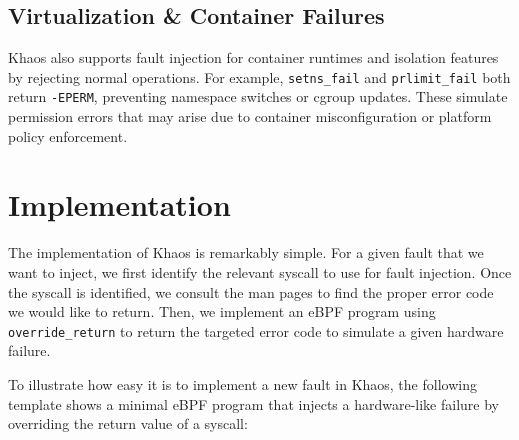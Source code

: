 \subsection{Virtualization \& Container Failures}

Khaos also supports fault injection for container runtimes and isolation features by rejecting normal operations. For example, \texttt{setns\_fail} and \texttt{prlimit\_fail} both return \texttt{-EPERM}, preventing namespace switches or cgroup updates. These simulate permission errors that may arise due to container misconfiguration or platform policy enforcement.


\begin{table}[H]
\centering
\caption{Virtualization \& Container Failures}
\label{virtualization_container_failures}
\end{table}



\section{Implementation}
The implementation of Khaos is remarkably simple. For a given fault that we want to inject, we first identify the relevant syscall to use for fault injection. Once the syscall is identified, we consult the man pages to find the proper error code we would like to return. Then, we implement an eBPF program using \texttt{override\_return} to return the targeted error code to simulate a given hardware failure.

To illustrate how easy it is to implement a new fault in Khaos, the following template shows a minimal eBPF program that injects a hardware-like failure by overriding the return value of a syscall:

